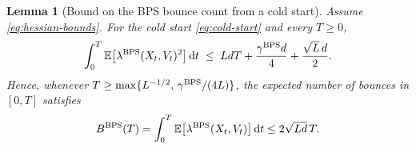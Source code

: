 \documentclass{amsart}
\theoremstyle{plain}
\newtheorem{lemma}[theorem]{Lemma}      %
\theoremstyle{definition}
\theoremstyle{remark}
\newcommand{\ud}{\,\mathrm{d}}
\newcommand{\EE}{\mathbb{E}}
\newcommand{\E}{\EE}
\newcommand{\1}{\mathbf 1}
\newcommand{\dd}{\ud}
\newcommand{\bps}{{\rm BPS}}
\begin{document}
\begin{lemma}[Bound on the BPS bounce count from a cold start]
\label{lem:bps-count}
Assume \eqref{eq:hessian-bounds}.
For the cold start \eqref{eq:cold-start} and every $T\ge0$,
\begin{equation}\label{eq:bps-square-rate-bound}
        \int_0^T\E\bigl[\lambda^{\bps}(X_t,V_t)^2\bigr]\dd t
        \;\le\; LdT+\frac{\gamma^{\bps} d}{4}+\frac{\sqrt L\,d}{2}.
\end{equation}
Hence, whenever $T\ge\max\{L^{-1/2},\,\gamma^{\bps}/(4L)\}$, the expected
number of bounces in $[0,T]$ satisfies
\begin{equation}\label{eq:bps-count-clean}
        B^{\bps}(T)
        =\int_0^T\E\bigl[\lambda^{\bps}(X_t,V_t)\bigr]\dd t
        \le 2\sqrt{Ld}\,T .
\end{equation}
\end{lemma}
\end{document}
